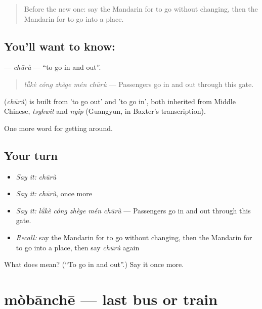 \begin{quote}
Before the new one: say the Mandarin for to go without changing, then the Mandarin for to go into a place.
\end{quote}

\subsection*{You'll want to know: }
\textbf{} — \emph{chūrù} — \textquotedblleft{}to go in and out\textquotedblright{}.

\begin{quote}
\textbf{} \emph{lǚkè cóng zhège mén chūrù} — Passengers go in and out through this gate.
\end{quote}

\begin{cousinweb}
\textbf{} (\emph{chūrù}) is built from  'to go out' and  'to go in', both inherited from Middle Chinese, \emph{tsyhwit} and \emph{nyip} (Guangyun, in Baxter's transcription).
\end{cousinweb}

\begin{grammarlens}[title={What you've built}]
One more word for getting around.
\end{grammarlens}

\subsection*{Your turn}
\begin{itemize}
\raggedright
  \item \emph{Say it:} \emph{chūrù}
  \item \emph{Say it:} \emph{chūrù}, once more
  \item \emph{Say it:} \emph{lǚkè cóng zhège mén chūrù} — Passengers go in and out through this gate.
  \item \emph{Recall:} say the Mandarin for to go without changing, then the Mandarin for to go into a place, then say \emph{chūrù} again
\end{itemize}

\begin{tcolorbox}[breakable,colback=teal!4,colframe=teal!35!black,title={Before you move on}]
What does  mean? (\textquotedblleft{}To go in and out\textquotedblright{}.) Say it once more.
\end{tcolorbox}
\section[mòbānchē]{mòbānchē — last bus or train}

